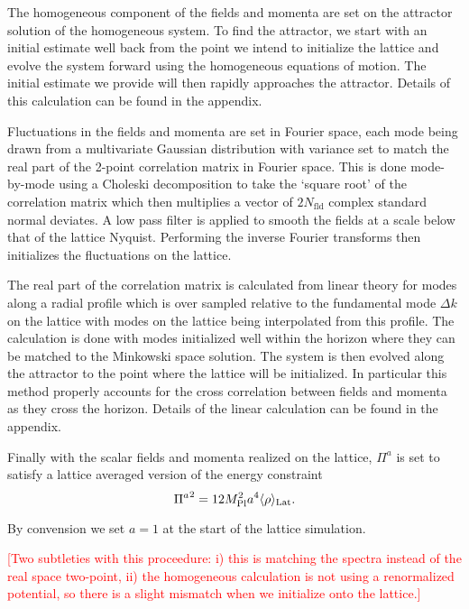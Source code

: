 The homogeneous component of the fields and momenta are set on the attractor solution of the homogeneous system. To find the attractor, we start with an initial estimate well back from the point we intend to initialize the lattice and evolve the system forward using the homogeneous equations of motion. The initial estimate we provide will then rapidly approaches the attractor. Details of this calculation can be found in the appendix. 

Fluctuations in the fields and momenta are set in Fourier space, each mode being drawn from a multivariate Gaussian distribution with variance set to match the real part of the 2-point correlation matrix in Fourier space. This is done mode-by-mode using a Choleski decomposition to take the `square root' of the correlation matrix which then multiplies a vector of $2N_\mathrm{fld}$ complex standard normal deviates. A low pass filter is applied to smooth the fields at a scale below that of the lattice Nyquist. Performing the inverse Fourier transforms then initializes the fluctuations on the lattice.

The real part of the correlation matrix is calculated from linear theory for modes along a radial profile which is over sampled relative to the fundamental mode $\Delta k$ on the lattice with modes on the lattice being interpolated from this profile. The calculation is done with modes initialized well within the horizon where they can be matched to the Minkowski space solution. The system is then evolved along the attractor to the point where the lattice will be initialized. In particular this method properly accounts for the cross correlation between fields and momenta as they cross the horizon. Details of the linear calculation can be found in the appendix.

Finally with the scalar fields and momenta realized on the lattice, $\Pi^a$ is set to satisfy a lattice averaged version of the energy constraint
\begin{equation} \label{eq:energy constraint}
  {\Pi^a}^2 = 12M_{\mathrm{Pl}}^2a^4\langle \rho \rangle_{\mathrm{Lat}}.
\end{equation}

By convension we set $a=1$ at the start of the lattice simulation.

\textcolor{red}{[Two subtleties with this proceedure: i) this is matching the spectra instead of the real space two-point, ii) the homogeneous calculation is not using a renormalized potential, so there is a slight mismatch when we initialize onto the lattice.]}

